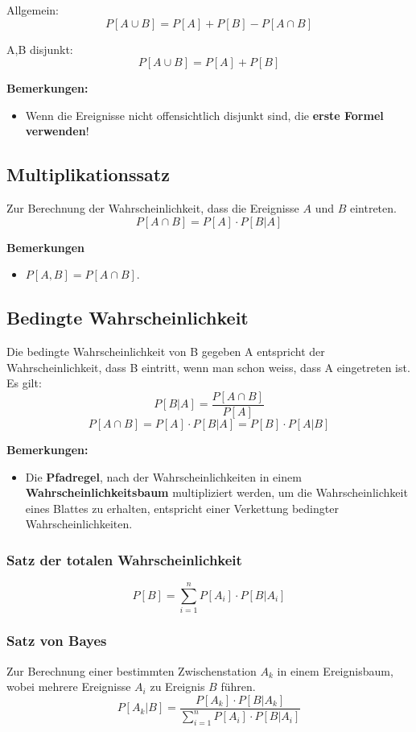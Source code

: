 \documentclass[10pt,a4paper,twocolumn]{article}
\begin{document}
\vspace{10pt}

Allgemein:
\[
P[A \cup B] = P[A] + P[B] - P[A \cap B]
\]

A,B disjunkt:
\[
P[A \cup B] = P[A] + P[B]
\]

\textbf{Bemerkungen:}
\begin{itemize}
\item Wenn die Ereignisse nicht offensichtlich disjunkt sind, die \textbf{erste Formel verwenden}!
\end{itemize}

\subsection{Multiplikationssatz}
Zur Berechnung der Wahrscheinlichkeit, dass die Ereignisse $A$ und $B$ eintreten.
\[
P[A \cap B] = P[A] \cdot P[B|A]
\]

\textbf{Bemerkungen}
\begin{itemize}
\item $P[A,B]=P[A \cap B]$.
\end{itemize}

\subsection{Bedingte Wahrscheinlichkeit}
Die bedingte Wahrscheinlichkeit von B gegeben A entspricht der Wahrscheinlichkeit, dass B eintritt, wenn man schon weiss, dass A eingetreten ist. Es gilt:
\[
P[B|A]=\frac{P[A\cap B]}{P[A]}
\]
\[
P[A\cap B]=P[A]\cdot P[B|A]=P[B]\cdot P[A|B]
\]

\textbf{Bemerkungen:}
\begin{itemize}
\item Die \textbf{Pfadregel}, nach der Wahrscheinlichkeiten in einem \textbf{Wahrscheinlichkeitsbaum} multipliziert werden, um die Wahrscheinlichkeit eines Blattes zu erhalten, entspricht einer Verkettung bedingter Wahrscheinlichkeiten.
\end{itemize}

\subsubsection{Satz der totalen Wahrscheinlichkeit}
\[
P[B] = \sum \limits_{i=1}^{n} P[A_i] \cdot P[B|A_i]
\]

\subsubsection{Satz von Bayes}
Zur Berechnung einer bestimmten Zwischenstation $A_k$ in einem Ereignisbaum, wobei mehrere Ereignisse $A_i$ zu Ereignis $B$ führen.
\[
P[A_k|B] = \frac{P[A_k] \cdot P[B|A_k]}{\sum \limits_{i=1}^{n} P[A_i] \cdot P[B|A_i]}
\]
\end{document}
